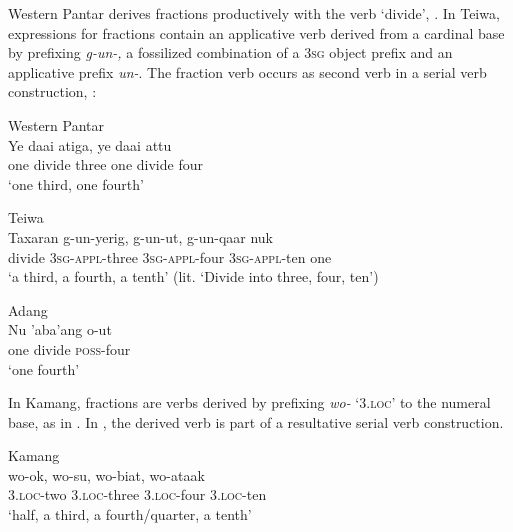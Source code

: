 Western Pantar derives fractions productively with the verb `divide', . In Teiwa, expressions for fractions contain an applicative verb derived from a cardinal base by prefixing \textit{g-un-,} a fossilized combination of a 3\textsc{sg} object prefix and an applicative prefix \textit{un-}. The fraction verb occurs as second verb in a serial verb construction, : 


\ea%
\label{bkm:Ref342746525}
{\upshape Western Pantar}\\
\gll   Ye  daai  atiga,  ye   daai  attu\\  
   one   divide  three   one  divide  four \\
\glt  `one third, one fourth'   
\z

 

\ea%
\label{bkm:Ref342746583}
{\upshape Teiwa}\\
\gll  Taxaran  g-un-yerig,  g-un-ut,  g-un-qaar nuk \\  
   divide  \textsc{3sg}-\textsc{appl}-three  \textsc{3sg}-\textsc{appl}-four  \textsc{3sg}-\textsc{appl}-ten one   \\
\glt  `a third, a fourth, a tenth' (lit. `Divide into three, four, ten')
\z


 

\ea
\label{ex:8:1248}
{\upshape Adang}\\
\gll Nu  'aba'ang  {\textglotstop}o-ut\\
  one  divide  \textsc{poss}{}-four\\
\glt `one fourth'
\z 

  

In Kamang, fractions are verbs derived by prefixing \textit{wo-} `3.\textsc{loc}' to the numeral base, as in . In , the derived verb is part of a resultative serial verb construction.


\ea%
\label{bkm:Ref342746224}
{\upshape Kamang}\\
\gll wo-ok,    wo-su,  wo-biat,  wo-ataak     \\  
   3.\textsc{loc}-two    3.\textsc{loc}-three  3.\textsc{loc}-four  3.\textsc{loc}-ten   \\
\glt `half, a third, a fourth/quarter, a tenth' 
\z

   

 

 


